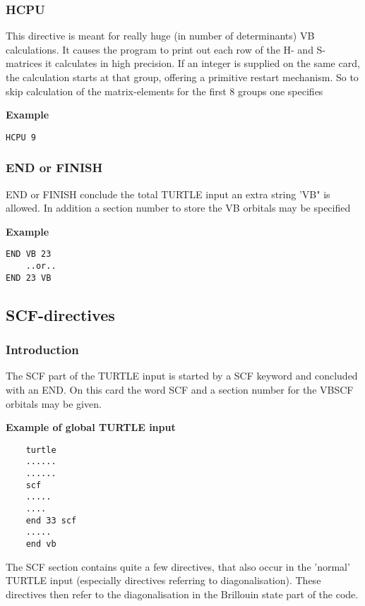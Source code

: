 \documentclass[11pt,fleqn]{article}
\begin{document}
\subsubsection{HCPU}

This directive is meant for really huge (in number of determinants) VB calculations.
It causes the program to print out each row of the H- and S-matrices it calculates
in high precision. If an integer is supplied on the same card, the calculation starts
at that group, offering a primitive restart mechanism. So to skip calculation
of the matrix-elements for the first 8 groups one specifies 

{\bf Example}
\begin{verbatim}
HCPU 9
\end{verbatim}

\subsubsection{END or FINISH}

END or FINISH conclude the total TURTLE input an extra string 'VB" is allowed.
In addition a section number to store the VB orbitals may be specified

{\bf Example}
\begin{verbatim}
END VB 23
    ..or..
END 23 VB
\end{verbatim}

\subsection{SCF-directives}

\subsubsection{Introduction}

The SCF part of the TURTLE input is started by a SCF keyword and 
concluded with an END. On this card the word SCF and a section number 
for the VBSCF orbitals may be given.

{\bf Example of global TURTLE input}
\begin{verbatim} 
    turtle
    ......
    ......
    scf
    .....
    ....
    end 33 scf
    .....
    end vb
\end{verbatim}

The SCF section contains quite a few directives, that also occur in the
'normal' TURTLE input (especially directives referring to
diagonalisation).  These directives then refer to the diagonalisation in
the Brillouin state part of the code.
\end{document}
